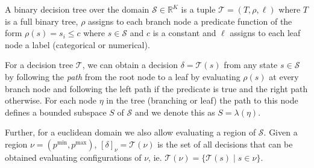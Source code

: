 \begin{definition}%
\label{def:decisionTree}
    A binary decision tree over the domain $\mathcal{S} \in \mathbb{R}^K$ is a
    tuple $\mathcal{T} = (T, \rho, \ell)$ where $T$ is a full binary tree,
    $\rho$ assigns to each branch node a predicate function of the form $\rho(s)
    = s_i \le c$ where $s \in \mathcal{S}$ and $c$ is a constant and $\ell$
    assigns to each leaf node a label (categorical or numerical).
\end{definition}

For a decision tree $\mathcal{T}$, we can obtain a decision $\delta =
\mathcal{T}(s)$ from any state $s \in \mathcal{S}$ by following the
\textit{path} from the root node to a leaf by evaluating $\rho(s)$ at every
branch node and following the left path if the predicate is true and the right
path otherwise. For each node $\eta$ in the tree (branching or leaf) the path to
this node defines a bounded subspace $S$ of $\mathcal{S}$ and we denote this as
$S = \lambda(\eta)$.

Further, for a euclidean domain we also allow evaluating a region of
$\mathcal{S}$. Given a region $\nu = (p^{\min}, p^{\max})$, $[\delta]_{\nu} =
\mathcal{T}(\nu)$ is the set of all decisions that can be obtained evaluating
configurations of $\nu$, ie. $\mathcal{T}(\nu) = \{ \mathcal{T}(s) \mid s \in \nu
\}$.

